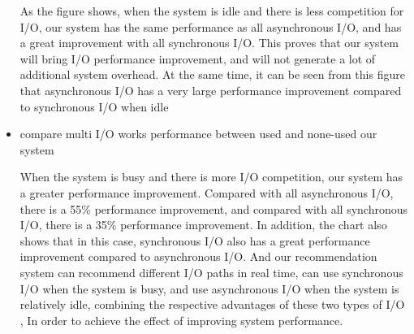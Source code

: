 \documentclass[conference]{IEEEtran}
\begin{document}
\begin{itemize}

As the figure shows, when the system is idle and there is less competition for I/O, 
our system has the same performance as all asynchronous I/O, and has a great improvement with all synchronous I/O. This proves that our system will bring I/O performance improvement, and will not generate a lot of additional system overhead. 
At the same time, it can be seen from this figure that asynchronous I/O has a very large performance improvement compared to synchronous I/O when idle

	\item compare multi I/O works performance between used and none-used our system
\datatable



  When the system is busy and there is more I/O competition, our system has a greater performance improvement. Compared with all asynchronous I/O, there is a 55\% performance improvement, and compared with all synchronous I/O, there is a 35\% performance improvement. In addition, the chart also shows that in this case, synchronous I/O also has a great performance improvement compared to asynchronous I/O.
And our recommendation system can recommend different I/O paths in real time, can use synchronous I/O when the system is busy, and use asynchronous I/O when the system is relatively idle, combining the respective advantages of these two types of I/O , In order to achieve the effect of improving system performance.


\end{itemize}
\end{document}
